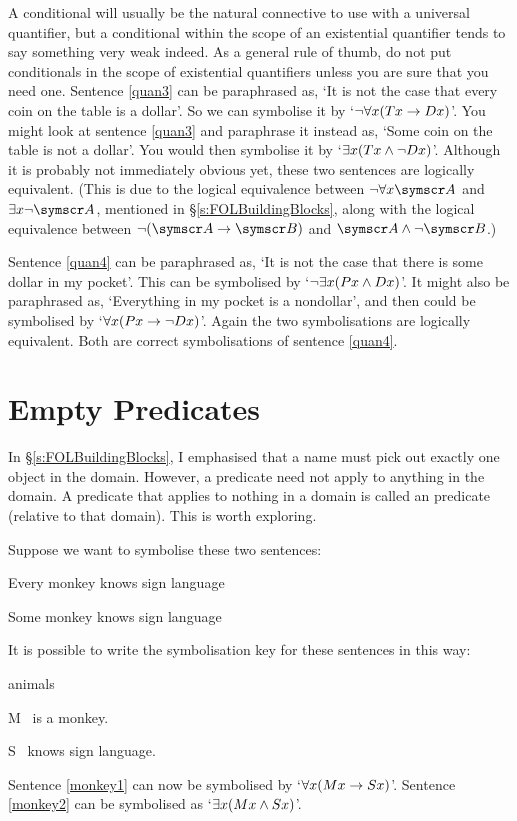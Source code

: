 A conditional will usually be the natural connective to use with a universal quantifier, but a conditional within the scope of an existential quantifier tends to say something very weak indeed. As a general rule of thumb, do not put conditionals in the scope of existential quantifiers unless you are sure that you need one.
Sentence \ref{quan3} can be paraphrased as, `It is not the case that every coin on the table is a dollar'. So we can symbolise it by `$\neg \forall x(Tx \rightarrow Dx)$'. You might look at sentence \ref{quan3} and paraphrase it instead as, `Some coin on the table is not a dollar'. You would then symbolise it by `$\exists x(Tx \wedge \neg Dx)$'. Although it is probably not immediately obvious yet, these two sentences are logically equivalent. (This is due to the logical equivalence between $\enot\forall x\meta{A}$ and $\exists x\enot\meta{A}$, mentioned in §\ref{s:FOLBuildingBlocks}, along with the logical equivalence between $\enot(\meta{A}\eif\meta{B})$ and $\meta{A}\eand\enot\meta{B}$.)

Sentence \ref{quan4} can be paraphrased as, `It is not the case that there is some dollar in my pocket'. This can be symbolised by `$\neg\exists x(Px \wedge Dx)$'. It might also be paraphrased as, `Everything in my pocket is a nondollar', and then could be symbolised by `$\forall x(Px \rightarrow \neg Dx)$'. Again the two symbolisations are logically equivalent. Both are correct symbolisations of sentence \ref{quan4}.


\section{Empty Predicates}
In §\ref{s:FOLBuildingBlocks}, I emphasised that a name must pick out exactly one object in the domain. However, a predicate need not apply to anything in the domain. A predicate that applies to nothing in a domain is called an  predicate (relative to that domain). This is worth exploring.

Suppose we want to symbolise these two sentences:
	\begin{earg}
		\item[\ex{monkey1}] Every monkey knows sign language
		\item[\ex{monkey2}] Some monkey knows sign language
	\end{earg}
It is possible to write the symbolisation key for these sentences in this way:
	\begin{ekey}
		\item[\domain] animals
		\item[M] \blank\ is a monkey.
		\item[S] \blank\ knows sign language.
	\end{ekey}
Sentence \ref{monkey1} can now be symbolised by `$\forall x(Mx \rightarrow Sx)$'. Sentence \ref{monkey2} can be symbolised as `$\exists x(Mx \wedge Sx)$'.

